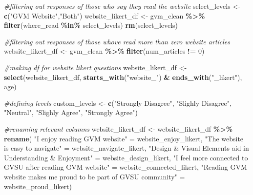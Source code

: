 \documentclass[
]{article}
\newenvironment{Shaded}{\begin{snugshade}}{\end{snugshade}}
\newcommand{\CommentTok}[1]{\textcolor[rgb]{0.56,0.35,0.01}{\textit{#1}}}
\newcommand{\DecValTok}[1]{\textcolor[rgb]{0.00,0.00,0.81}{#1}}
\newcommand{\FunctionTok}[1]{\textcolor[rgb]{0.13,0.29,0.53}{\textbf{#1}}}
\newcommand{\NormalTok}[1]{#1}
\newcommand{\OtherTok}[1]{\textcolor[rgb]{0.56,0.35,0.01}{#1}}
\newcommand{\SpecialCharTok}[1]{\textcolor[rgb]{0.81,0.36,0.00}{\textbf{#1}}}
\newcommand{\StringTok}[1]{\textcolor[rgb]{0.31,0.60,0.02}{#1}}
\begin{document}
\begin{Shaded}
\begin{Highlighting}[]
\CommentTok{\#filtering out responses of those who say they read the website}
\NormalTok{select\_levels }\OtherTok{\textless{}{-}} \FunctionTok{c}\NormalTok{(}\StringTok{"GVM Website"}\NormalTok{,}\StringTok{"Both"}\NormalTok{)}
\NormalTok{website\_likert\_df }\OtherTok{\textless{}{-}}\NormalTok{ gvm\_clean }\SpecialCharTok{\%\textgreater{}\%}
  \FunctionTok{filter}\NormalTok{(where\_read }\SpecialCharTok{\%in\%}\NormalTok{ select\_levels)}
\FunctionTok{rm}\NormalTok{(select\_levels)}

\CommentTok{\#filtering out responses of those who\textquotesingle{}ve read more than zero website articles}
\NormalTok{website\_likert\_df }\OtherTok{\textless{}{-}}\NormalTok{ gvm\_clean }\SpecialCharTok{\%\textgreater{}\%}
  \FunctionTok{filter}\NormalTok{(num\_articles }\SpecialCharTok{!=} \DecValTok{0}\NormalTok{)}

\CommentTok{\#making df for website likert questions}
\NormalTok{website\_likert\_df }\OtherTok{\textless{}{-}} \FunctionTok{select}\NormalTok{(website\_likert\_df, }\FunctionTok{starts\_with}\NormalTok{(}\StringTok{"website\_"}\NormalTok{) }\SpecialCharTok{\&} \FunctionTok{ends\_with}\NormalTok{(}\StringTok{"\_likert"}\NormalTok{), age)}

\CommentTok{\#defining levels}
\NormalTok{custom\_levels }\OtherTok{\textless{}{-}} \FunctionTok{c}\NormalTok{(}\StringTok{"Strongly Disagree"}\NormalTok{, }\StringTok{"Slighly Disagree"}\NormalTok{, }\StringTok{"Neutral"}\NormalTok{, }\StringTok{"Slighly Agree"}\NormalTok{, }\StringTok{"Strongly Agree"}\NormalTok{)}



\CommentTok{\#renaming relevant columns}
\NormalTok{website\_likert\_df }\OtherTok{\textless{}{-}}\NormalTok{ website\_likert\_df }\SpecialCharTok{\%\textgreater{}\%} \FunctionTok{rename}\NormalTok{(}
  \StringTok{"I enjoy reading GVM website"} \OtherTok{=}\NormalTok{ website\_enjoy\_likert,}
  \StringTok{"The website is easy to navigate"} \OtherTok{=}\NormalTok{ website\_navigate\_likert,}
  \StringTok{"Design \& Visual Elements aid in Understanding \& Enjoyment"} \OtherTok{=}\NormalTok{ website\_design\_likert,}
  \StringTok{"I feel more connected to GVSU after reading GVM website"} \OtherTok{=}\NormalTok{ website\_connected\_likert,}
  \StringTok{"Reading GVM website makes me proud to be part of GVSU community"} \OtherTok{=}\NormalTok{ website\_proud\_likert)}


\end{Highlighting}
\end{Shaded}
\end{document}
